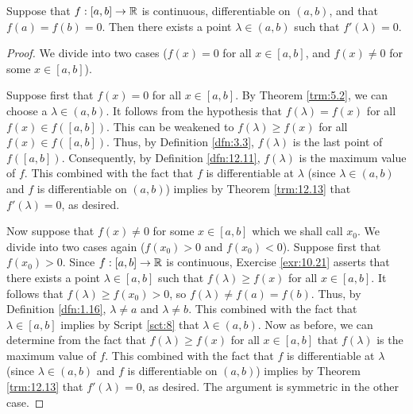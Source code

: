 \documentclass[../main.tex]{subfiles}
\begin{document}
\begin{theorem}\label{trm:12.15}
    Suppose that $f:[a,b]\to\mathbb{R}$ is continuous, differentiable on $(a,b)$, and that $f(a)=f(b)=0$. Then there exists a point $\lambda\in(a,b)$ such that $f'(\lambda)=0$.
    \begin{proof}
        We divide into two cases ($f(x)=0$ for all $x\in[a,b]$, and $f(x)\neq 0$ for some $x\in[a,b]$).\par
        Suppose first that $f(x)=0$ for all $x\in[a,b]$. By Theorem \ref{trm:5.2}, we can choose a $\lambda\in(a,b)$. It follows from the hypothesis that $f(\lambda)=f(x)$ for all $f(x)\in f([a,b])$. This can be weakened to $f(\lambda)\geq f(x)$ for all $f(x)\in f([a,b])$. Thus, by Definition \ref{dfn:3.3}, $f(\lambda)$ is the last point of $f([a,b])$. Consequently, by Definition \ref{dfn:12.11}, $f(\lambda)$ is the maximum value of $f$. This combined with the fact that $f$ is differentiable at $\lambda$ (since $\lambda\in(a,b)$ and $f$ is differentiable on $(a,b)$) implies by Theorem \ref{trm:12.13} that $f'(\lambda)=0$, as desired.\par
        Now suppose that $f(x)\neq 0$ for some $x\in[a,b]$ which we shall call $x_0$. We divide into two cases again ($f(x_0)>0$ and $f(x_0)<0$). Suppose first that $f(x_0)>0$. Since $f:[a,b]\to\mathbb{R}$ is continuous, Exercise \ref{exr:10.21} asserts that there exists a point $\lambda\in[a,b]$ such that $f(\lambda)\geq f(x)$ for all $x\in[a,b]$. It follows that $f(\lambda)\geq f(x_0)>0$, so $f(\lambda)\neq f(a)=f(b)$. Thus, by Definition \ref{dfn:1.16}, $\lambda\neq a$ and $\lambda\neq b$. This combined with the fact that $\lambda\in[a,b]$ implies by Script \ref{sct:8} that $\lambda\in(a,b)$. Now as before, we can determine from the fact that $f(\lambda)\geq f(x)$ for all $x\in[a,b]$ that $f(\lambda)$ is the maximum value of $f$. This combined with the fact that $f$ is differentiable at $\lambda$ (since $\lambda\in(a,b)$ and $f$ is differentiable on $(a,b)$) implies by Theorem \ref{trm:12.13} that $f'(\lambda)=0$, as desired. The argument is symmetric in the other case.
    \end{proof}
\end{theorem}
\end{document}

